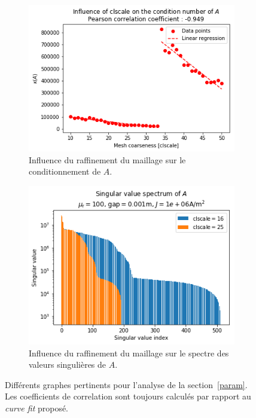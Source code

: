\documentclass[11pt]{article}
\begin{document}
\begin{figure}[H]
\begin{subfigure}{0.24\textwidth}
		\centering
		\includegraphics[width=\linewidth]{clscalecond.png}
		\caption{Influence du raffinement du maillage sur le conditionnement de $A$.}
		\label{fig:lclscalecond}
	\end{subfigure}\hfill
	\begin{subfigure}{0.24\textwidth}
		\centering
		\includegraphics[width=\linewidth]{clscalespec.png}
		\caption{Influence du raffinement du maillage sur le spectre des valeurs singulières de $A$.}
		\label{fig:clscalespec}
	\end{subfigure}
	\caption{Différents graphes pertinents pour l'analyse de la section~\ref{param}.
	Les coefficients de correlation sont toujours calculés par rapport au \emph{curve fit} proposé.}
	\label{fig:figsec1}
\end{figure}
\end{document}

